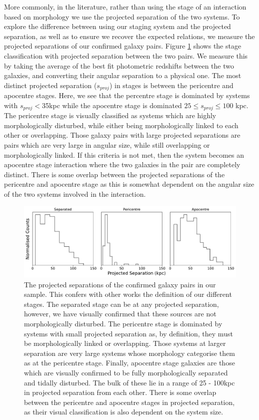 More commonly, in the literature, rather than using the stage of an interaction based on morphology we use the projected separation of the two systems. To explore the difference between using our staging system and the projected separation, as well as to ensure we recover the expected relations, we measure the projected separations of our confirmed galaxy pairs. Figure \ref{fig:proj-seps} shows the stage classification with projected separation between the two pairs. We measure this by taking the average of the best fit photometric redshifts between the two galaxies, and converting their angular separation to a physical one. The most distinct projected separation ($s_{proj}$) in stages is between the pericentre and apocentre stages. Here, we see that the percentre stage is dominated by systems with $s_{proj}<$35kpc while the apocentre stage is dominated $25 \leq s_{proj} \leq 100$ kpc. The pericentre stage is visually classified as systems which are highly morphologically disturbed, while either being morphologically linked to each other or overlapping. Those galaxy pairs with large projected separations are pairs which are very large in angular size, while still overlapping or morphologically linked. If this criteria is not met, then the system becomes an apocentre stage interaction where the two galaxies in the pair are completely distinct. There is some overlap between the projected separations of the pericentre and apocentre stage as this is somewhat dependent on the angular size of the two systems involved in the interaction.

\begin{figure}
    \centering
    \includegraphics[width=\textwidth]{Chapter3/figures/projected-seps.pdf}
    \caption[The projected separations of the confirmed galaxy pairs in our sample.]{The projected separations of the confirmed galaxy pairs in our sample. This confers with other works the definition of our different stages. The separated stage can be at any projected separation, however, we have visually confirmed that these sources are not morphologically disturbed. The pericentre stage is dominated by systems with small projected separation as, by definition, they must be morphologically linked or overlapping. Those systems at larger separation are very large systems whose morphology categorise them as at the pericentre stage. Finally, apocentre stage galaxies are those which are visually confirmed to be fully morphologically separated and tidally disturbed. The bulk of these lie in a range of 25 - 100kpc in projected separation from each other. There is some overlap between the pericentre and apocentre stages in projected separation, as their visual classification is also dependent on the system size.}
    \label{fig:proj-seps}
\end{figure}

